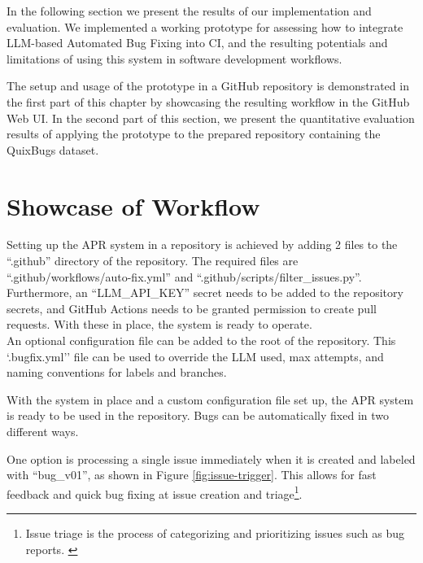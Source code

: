 In the following section we present the results of our implementation and evaluation. We implemented a working prototype for assessing how to integrate LLM-based Automated Bug Fixing into \ac{CI}, and the resulting potentials and limitations of using this system in software development workflows.

The setup and usage of the prototype in a GitHub repository is demonstrated in the first part of this chapter by showcasing the resulting workflow in the GitHub Web \ac{UI}.
In the second part of this section, we present the quantitative evaluation results of applying the prototype to the prepared repository containing the QuixBugs dataset.

\section{Showcase of Workflow} \label{section:showcase}

Setting up the APR system in a repository is achieved by adding 2 files to the ``.github'' directory of the repository. The required files are ``.github/workflows/auto-fix.yml'' and ``.github/scripts/filter\_issues.py''. Furthermore, an ``LLM\_API\_KEY'' secret needs to be added to the repository secrets, and GitHub Actions needs to be granted permission to create pull requests. With these in place, the system is ready to operate.\\
An optional configuration file can be added to the root of the repository. This `.bugfix.yml'' file can be used to override the \ac{LLM} used, max attempts, and naming conventions for labels and branches.

With the system in place and a custom configuration file set up, the APR system is ready to be used in the repository. Bugs can be automatically fixed in two different ways.

One option is processing a single issue immediately when it is created and labeled with ``bug\_v01'', as shown in Figure \ref{fig:issue-trigger}. This allows for fast feedback and quick bug fixing at issue creation and triage\footnote{Issue triage is the process of categorizing and prioritizing issues such as bug reports. \cite{IssuesTriaging}}.

